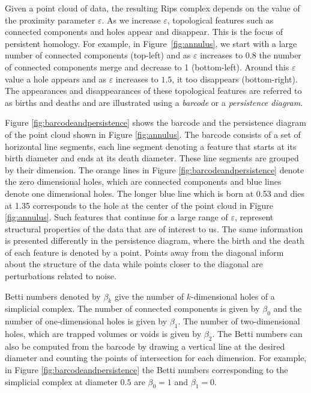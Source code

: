 \documentclass[11pt,a4paper,]{article}
\theoremstyle{definition}
\theoremstyle{definition}
\theoremstyle{definition}
\theoremstyle{remark}
\begin{document}
Given a point cloud of data, the resulting Rips complex depends on the value of the proximity parameter \(\varepsilon\). As we increase \(\varepsilon\), topological features such as connected components and holes appear and disappear. This is the focus of persistent homology. For example, in Figure~\ref{fig:annulus}, we start with a large number of connected components (top-left) and as \(\varepsilon\) increases to \(0.8\) the number of connected components merge and decrease to 1 (bottom-left). Around this \(\varepsilon\) value a hole appears and as \(\varepsilon\) increases to \(1.5\), it too disappears (bottom-right). The appearances and disappearances of these topological features are referred to as births and deaths and are illustrated using a \emph{barcode} or a \emph{persistence diagram}.

Figure \ref{fig:barcodeandpersistence} shows the barcode and the persistence diagram of the point cloud shown in Figure \ref{fig:annulus}. The barcode consists of a set of horizontal line segments, each line segment denoting a feature that starts at its birth diameter and ends at its death diameter. These line segments are grouped by their dimension. The orange lines in Figure \ref{fig:barcodeandpersistence} denote the zero dimensional holes, which are connected components and blue lines denote one dimensional holes. The longer blue line which is born at 0.53 and dies at 1.35 corresponds to the hole at the center of the point cloud in Figure \ref{fig:annulus}. Such features that continue for a large range of \(\varepsilon\), represent structural properties of the data that are of interest to us. The same information is presented differently in the persistence diagram, where the birth and the death of each feature is denoted by a point. Points away from the diagonal inform about the structure of the data while points closer to the diagonal are perturbations related to noise.

Betti numbers denoted by \(\beta_k\) give the number of \(k\)-dimensional holes of a simplicial complex. The number of connected components is given by \(\beta_0\) and the number of one-dimensional holes is given by \(\beta_1\). The number of two-dimensional holes, which are trapped volumes or voids is given by \(\beta_2\). The Betti numbers can also be computed from the barcode by drawing a vertical line at the desired diameter and counting the points of intersection for each dimension. For example, in Figure \ref{fig:barcodeandpersistence} the Betti numbers corresponding to the simplicial complex at diameter \(0.5\) are \(\beta_0 = 1\) and \(\beta_1 = 0\).
\end{document}
